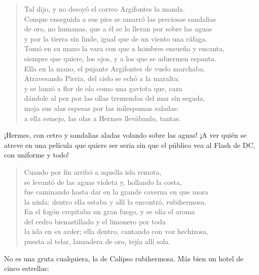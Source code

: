\documentclass[11pt,a4paper]{article}
\begin{document}
\begin{verse}
Tal dijo, y no desoyó el correo Argifontes la manda.\\
Conque enseguida a sus pies se amarró las preciosas sandalias\\
de oro, no humanas, que a él se lo llevan por sobre las aguas\\
y por la tierra sin linde, igual que de un viento una ráfaga.\\
Tomó en su mano la vara con que a hombres ensueña y encanta,\\
siempre que quiere, los ojos, y a los que se aduermen espanta.\\
Ella en la mano, el pujante Argifontes de vuelo marchaba.\\
Atravesando Pieria, del cielo se echó a la maralta;\\
y se lanzó a flor de ola como una gaviota que, caza\\
dándole al pez por las ollas tremendas del mar sin segada,\\
moja sus alas espesas por las milespumas saladas:\\
a ella semejo, las olas a Hermes llevábanlo, tantas.
\end{verse}

¡Hermes, con cetro y sandalias aladas volando sobre las aguas! ¡A ver quién se atreve en una película que quiere ser seria sin que el público vea al Flash de DC, con uniforme y todo!

\begin{verse}
Cuando por fin arribó a aquella isla remota,\\
se levantó de las aguas violeta y, hollando la costa,\\
fue caminando hasta dar en la grande caverna en que mora\\
la ninfa: dentro ella estaba y allí la encontró, rubihermosa.\\
En el fogón crepitaba un gran fuego, y se olía el aroma\\
del cedro bienastillado y el limonero por toda\\
la isla en su arder; ella dentro, cantando con voz hechizosa,\\
puesta al telar, lanzadera de oro, tejía allí sola.
\end{verse}

No es una gruta cualquiera, la de Calipso rubihermosa. Más bien un hotel de cinco estrellas:
\end{document}
